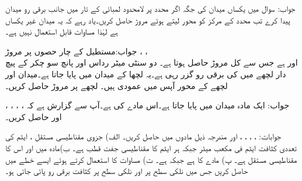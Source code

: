 جواب:
سوال  میں یکساں میدان کی جگہ اگر  محدد پر لامحدود لمبائی کے تار میں  جانب  برقی رو میدان پیدا کرے تب محدد کے مرکز  کو محور لیتے ہوئے مروڑ حاصل کریں۔یاد رہے کہ یہ میدان غیر یکساں ہے لہٰذا مساوات   قابل استعمال نہیں ہے۔

جواب:مستطیل کے چار حصوں پر مروڑ ، ، \\
 اور   ہے جس سے کل مروڑ   حاصل ہوتا ہے۔
دو سنٹی میٹر رداس اور پانچ سو چکر کے پیچ دار لچھے میں  کی برقی رو گزر رہی ہے۔یہ لچھا  کے میدان میں پایا جاتا ہے۔میدان اور لچھے کے محور آپس میں عمودی ہیں۔ لچھے پر مروڑ حاصل کریں۔

جواب:
ایک مادہ  میدان  میں پایا جاتا ہے۔اس مادے کی  ہے۔آپ سے گزارش ہے کہ ، ، ،  ، اور  حاصل کریں۔

جوابات: ، ، ، ،  اور 
مندرجہ ذیل مادوں میں  حاصل کریں۔ الف) جزوی مقناطیسی مستقل ، ایٹم کی تعددی کثافت  ایٹم فی مکعب میٹر جبکہ ہر ایٹم کا مقناطیسی جفت قطب  ہے۔ ب)مادہ میں  اور  اس کا مقناطیسی مستقل  ہے۔ پ) مادے کا  ہے جبکہ  ہے۔ ت) مساوات  کا استعمال کرتے ہوئے  ایسے خطے میں  حاصل کریں جس میں نلکی سطح  پر  اور نلکی سطح  پر  کثافت برقی رو پائی جاتی ہو۔

